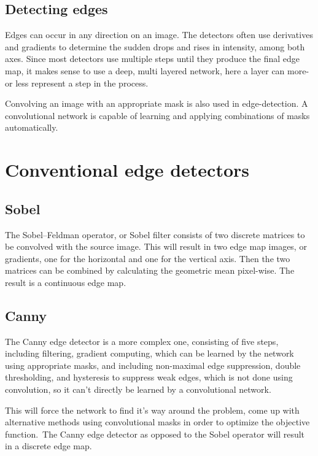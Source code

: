 \documentclass[12pt]{report}
\begin{document}
\subsection{Detecting edges}
Edges can occur in any direction on an image. The detectors often use derivatives and gradients to determine the sudden drops and rises in intensity, among both axes. Since most detectors use multiple steps until they produce the final edge map, it makes sense to use a deep, multi layered network, here a layer can more-or less represent a step in the process.\par
Convolving an image with an appropriate mask is also used in edge-detection. A convolutional network is capable of learning and applying combinations of masks automatically.
\section{Conventional edge detectors}
\subsection{Sobel}
The Sobel–Feldman operator, or Sobel filter consists of two discrete matrices to be convolved with the source image. This will result in two edge map images, or gradients, one for the horizontal and one for the vertical axis. Then the two matrices can be combined by calculating the geometric mean pixel-wise. The result is a continuous edge map.
\subsection{Canny}
The Canny edge detector is a more complex one, consisting of five steps, including filtering, gradient computing, which can be learned by the network using appropriate masks, and including non-maximal edge suppression, double thresholding, and hysteresis to suppress weak edges, which is not done using convolution, so it can't directly be learned by a convolutional network.\par
This will force the network to find it's way around the problem, come up with alternative methods using convolutional masks in order to optimize the objective function.\
The Canny edge detector as opposed to the Sobel operator will result in a discrete edge map.
\end{document}
